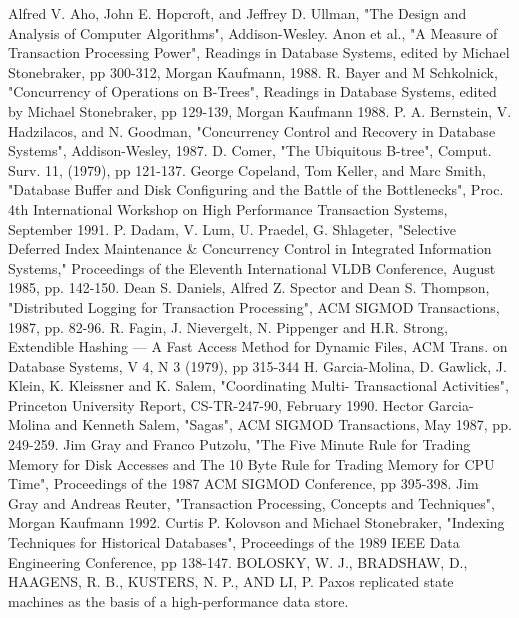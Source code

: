 \begin{thebibliography}{99}
    Alfred V. Aho, John E. Hopcroft, and Jeffrey D. Ullman, "The Design and Analysis of 
    Computer Algorithms", Addison-Wesley.
    Anon et al., "A Measure of Transaction Processing Power", Readings in Database Systems,
    edited by Michael Stonebraker, pp 300-312, Morgan Kaufmann, 1988.
    R. Bayer and M Schkolnick, "Concurrency of Operations on B-Trees", Readings in Database
    Systems, edited by Michael Stonebraker, pp 129-139, Morgan Kaufmann 1988.
    P. A. Bernstein, V. Hadzilacos, and N. Goodman, "Concurrency Control and Recovery in
    Database Systems", Addison-Wesley, 1987.
    D. Comer, "The Ubiquitous B-tree", Comput. Surv. 11, (1979), pp 121-137.
    George Copeland, Tom Keller, and Marc Smith, "Database Buffer and Disk Configuring and
    the Battle of the Bottlenecks", Proc. 4th International Workshop on High Performance
    Transaction Systems, September 1991.
    P. Dadam, V. Lum, U. Praedel, G. Shlageter, "Selective Deferred Index Maintenance \&
    Concurrency Control in Integrated Information Systems," Proceedings of the Eleventh International VLDB Conference, August 1985, pp. 142-150.
    Dean S. Daniels, Alfred Z. Spector and Dean S. Thompson, "Distributed Logging for
    Transaction Processing", ACM SIGMOD Transactions, 1987, pp. 82-96.
    R. Fagin, J. Nievergelt, N. Pippenger and H.R. Strong, Extendible Hashing — A Fast Access
    Method for Dynamic Files, ACM Trans. on Database Systems, V 4, N 3 (1979), pp 315-344
    H. Garcia-Molina, D. Gawlick, J. Klein, K. Kleissner and K. Salem, "Coordinating Multi-
    Transactional Activities", Princeton University Report, CS-TR-247-90, February 1990.
     Hector Garcia-Molina and Kenneth Salem, "Sagas", ACM SIGMOD Transactions, May 1987,
    pp. 249-259.
    Jim Gray and Franco Putzolu, "The Five Minute Rule for Trading Memory for Disk
    Accesses and The 10 Byte Rule for Trading Memory for CPU Time", Proceedings of the 1987
    ACM SIGMOD Conference, pp 395-398.
    Jim Gray and Andreas Reuter, "Transaction Processing, Concepts and Techniques",
    Morgan Kaufmann 1992.
    Curtis P. Kolovson and Michael Stonebraker, "Indexing Techniques for Historical 
    Databases", Proceedings of the 1989 IEEE Data Engineering Conference, pp 138-147.
     BOLOSKY, W. J., BRADSHAW, D., HAAGENS, R. B.,
    KUSTERS, N. P., AND LI, P. Paxos replicated state
    machines as the basis of a high-performance data store.

\end{thebibliography}
